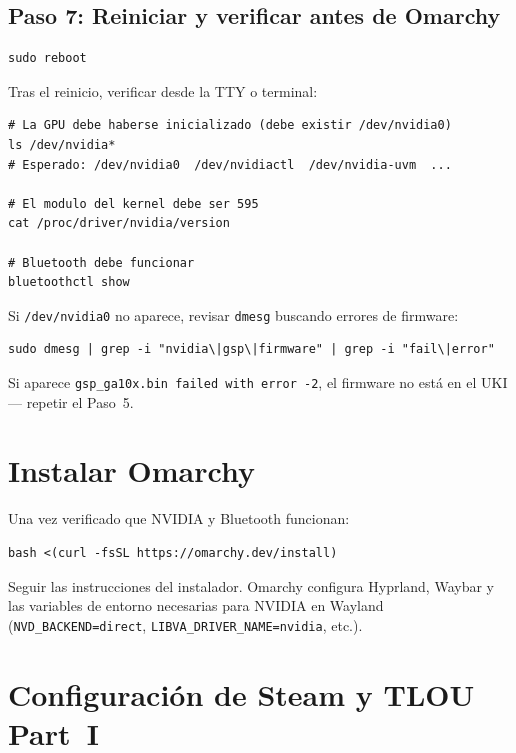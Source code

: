 \documentclass[12pt,a4paper]{article}
\begin{document}
\subsection{Paso 7: Reiniciar y verificar antes de Omarchy}

\begin{lstlisting}[style=bash]
sudo reboot
\end{lstlisting}

Tras el reinicio, verificar desde la TTY o terminal:

\begin{lstlisting}[style=bash]
# La GPU debe haberse inicializado (debe existir /dev/nvidia0)
ls /dev/nvidia*
# Esperado: /dev/nvidia0  /dev/nvidiactl  /dev/nvidia-uvm  ...

# El modulo del kernel debe ser 595
cat /proc/driver/nvidia/version

# Bluetooth debe funcionar
bluetoothctl show
\end{lstlisting}

Si \texttt{/dev/nvidia0} no aparece, revisar \texttt{dmesg} buscando errores
de firmware:

\begin{lstlisting}[style=bash]
sudo dmesg | grep -i "nvidia\|gsp\|firmware" | grep -i "fail\|error"
\end{lstlisting}

Si aparece \texttt{gsp\_ga10x.bin failed with error -2}, el firmware no
está en el UKI --- repetir el Paso~5.

\section{Instalar Omarchy}

Una vez verificado que NVIDIA y Bluetooth funcionan:

\begin{lstlisting}[style=bash]
bash <(curl -fsSL https://omarchy.dev/install)
\end{lstlisting}

Seguir las instrucciones del instalador. Omarchy configura Hyprland, Waybar
y las variables de entorno necesarias para NVIDIA en Wayland
(\texttt{NVD\_BACKEND=direct}, \texttt{LIBVA\_DRIVER\_NAME=nvidia}, etc.).

\section{Configuración de Steam y TLOU Part~I}
\end{document}
